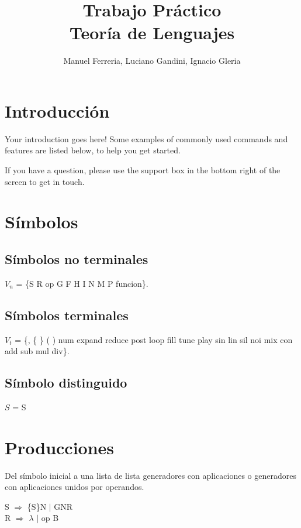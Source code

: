 \documentclass[a4paper]{article}
\title{Trabajo Práctico \\ Teoría de Lenguajes}
\author{Manuel Ferreria, Luciano Gandini, Ignacio Gleria}
\begin{document}
\maketitle



\section{Introducción}

Your introduction goes here! Some examples of commonly used commands and features are listed below, to help you get started.

If you have a question, please use the support box in the bottom right of the screen to get in touch. 

\section{Símbolos}


\subsection{Símbolos no terminales}

\begin{center}
$V_n$ = \{S R op G F H I N M P funcion\}.
\end{center}

\subsection{Símbolos terminales}

\begin{center}
$V_t$ = \{, \{ \} ( ) num expand reduce post loop fill tune play sin lin sil noi mix con add sub mul div\}.
\end{center}

\subsection{Símbolo distinguido}

\begin{center}
$S$ = S 
\end{center}

\section{Producciones}

Del símbolo inicial a una lista de lista generadores con aplicaciones o generadores con aplicaciones unidos por operandos.
\begin{center}
S $\Rightarrow$ \{S\}N $|$ GNR \\
R $\Rightarrow$ $\lambda$ $|$ op B 
\end{center}
\end{document}
